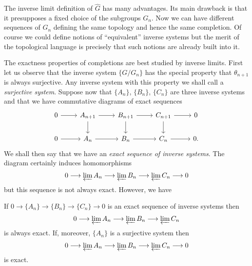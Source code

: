 The inverse limit definition of $\widehat{G}$ has many advantages. Its main drawback is that it presupposes a fixed choice of the subgroups $G_n$. Now we can have different sequences of $G_n$ defining the same topology and hence the same completion. Of course we could define notions of ``equivalent'' inverse systems but the merit of the topological language is precisely that such notions are already built into it.

The exactness properties of completions are best studied by inverse limits. First let us observe that the inverse system $\{G/G_n\}$ has the special property that $\theta_{n+1}$ is always surjective. Any inverse system with this property we shall call a \emph{surjective system}. Suppose now that $\{A_n\}$, $\{B_n\}$, $\{C_n\}$ are three inverse systems and that we have commutative diagrams of exact sequences
\[\begin{tikzcd}
	0 & {A_{n+1}} & {B_{n+1}} & {C_{n+1}} & 0 \\
	0 & {A_n} & {B_n} & {C_n} & 0.
	\arrow[from=1-1, to=1-2]
	\arrow[from=1-2, to=1-3]
	\arrow[from=1-2, to=2-2]
	\arrow[from=1-3, to=1-4]
	\arrow[from=1-3, to=2-3]
	\arrow[from=1-4, to=1-5]
	\arrow[from=1-4, to=2-4]
	\arrow[from=2-1, to=2-2]
	\arrow[from=2-2, to=2-3]
	\arrow[from=2-3, to=2-4]
	\arrow[from=2-4, to=2-5]
\end{tikzcd}\]
We shall then say that we have an \emph{exact sequence of inverse systems}. The diagram certainly induces homomorphisms
\[
    0 \longrightarrow \varprojlim A_n \longrightarrow \varprojlim B_n \longrightarrow \varprojlim C_n \longrightarrow 0
\]
but this sequence is not always exact. However, we have

\begin{proposition}\label{prop:inverse-limit-exact}
If $0 \longrightarrow \{A_n\} \longrightarrow \{B_n\} \longrightarrow \{C_n\} \longrightarrow 0$ is an exact sequence of inverse systems then
\[
    0 \longrightarrow \varprojlim A_n \longrightarrow \varprojlim B_n \longrightarrow \varprojlim C_n
\]
is always exact. If, moreover, $\{A_n\}$ is a surjective system then
\[
    0 \longrightarrow \varprojlim A_n \longrightarrow \varprojlim B_n \longrightarrow \varprojlim C_n \longrightarrow 0
\]
is exact.
\end{proposition}

